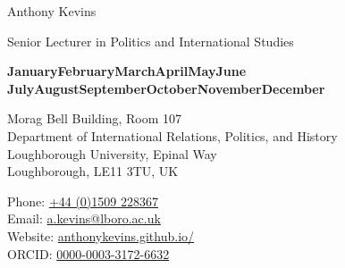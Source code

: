 \documentclass[letterpaper,fontsize=10.5pt]{scrartcl}
\newcommand{\monthyear}{%
  \ifcase\month\or January\or February\or March\or April\or May\or June\or
  July\or August\or September\or October\or November\or December\fi
  \space\number\year
}
\begin{document}
\pagestyle{plain}



\huge Anthony Kevins\\
\begin{minipage}[t]{.75\linewidth}
	\large Senior Lecturer in Politics and International Studies\\
\end{minipage}%
\begin{minipage}[t]{.25\linewidth}
	\raggedleft
	\scriptsize \textbf{\monthyear}\\
\end{minipage}%
\normalsize

\hrulefill

\begin{minipage}[p]{.6\linewidth}
	\raggedright
	\medskip
	Morag Bell Building, Room 107\\
	Department of International Relations, Politics, and History\\
	Loughborough University, Epinal Way\\
	Loughborough, LE11 3TU, UK\\
	\medskip
\end{minipage}%
\begin{minipage}[p]{.4\linewidth}
	\raggedleft
	\medskip
	Phone: \href{tel:+4401509228367}{+44 (0)1509 228367}\\
	Email: \href{mailto:a.kevins@lboro.ac.uk}{a.kevins@lboro.ac.uk}\\
	Website: \href{https://anthonykevins.github.io/}{anthonykevins.github.io/}\\
	ORCID: \href{https://orcid.org/0000-0003-3172-6632}{0000-0003-3172-6632}\\
	\medskip%
\end{minipage}

\hrulefill

\end{document}
